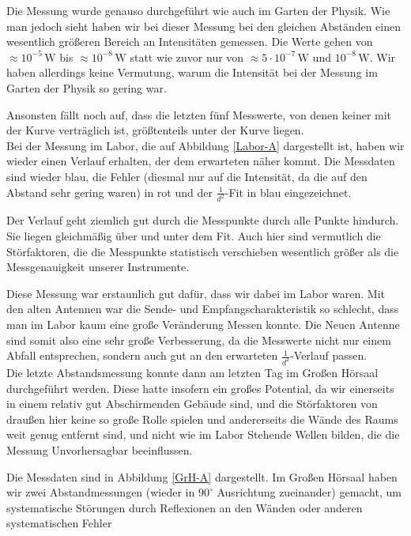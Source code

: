 \documentclass[titlepage,11pt,a4paper,ngerman]{article}
\newcommand{\tx}[1]{\textrm{#1}}
\begin{document}
Die Messung wurde genauso durchgeführt wie auch im Garten der Physik. Wie man jedoch sieht haben wir bei dieser Messung bei den gleichen Abständen einen wesentlich größeren Bereich an Intensitäten gemessen. Die Werte gehen von $ \approx 10^{-5} \, \tx{W} $ bis $ \approx 10^{-8} \, \tx{W} $ statt wie zuvor nur von $ \approx 5 \cdot 10^{-7} \, \tx{W} $ und $ 10^{-8} \, \tx{W} $. Wir haben allerdings keine Vermutung, warum die Intensität bei der Messung im Garten der Physik so gering war.\par
Ansonsten fällt noch auf, dass die letzten fünf Messwerte, von denen keiner mit der Kurve verträglich ist, größtenteils unter der Kurve liegen.\\[10pt]
\noindent
Bei der Messung im Labor, die auf Abbildung \ref{Labor-A} dargestellt ist, haben wir wieder einen Verlauf erhalten, der dem erwarteten näher kommt. Die Messdaten sind wieder blau, die Fehler (diesmal nur auf die Intensität, da die auf den Abstand sehr gering waren) in rot und der $ \frac{1}{d^2} $-Fit in blau eingezeichnet.\par
Der Verlauf geht ziemlich gut durch die Messpunkte durch alle Punkte hindurch. Sie liegen gleichmäßig über und unter dem Fit. Auch hier sind vermutlich die Störfaktoren, die die Messpunkte statistisch verschieben wesentlich größer als die Messgenauigkeit unserer Instrumente.\par
Diese Messung war erstaunlich gut dafür, dass wir dabei im Labor waren. Mit den alten Antennen war die Sende- und Empfangscharakteristik so schlecht, dass man im Labor kaum eine große Veränderung Messen konnte. Die Neuen Antenne sind somit also eine sehr große Verbesserung, da die Messwerte nicht nur einem Abfall entsprechen, sondern auch gut an den erwarteten $ \frac{1}{d^2} $-Verlauf passen.\\[10pt]
\noindent
Die letzte Abstandsmessung konnte dann am letzten Tag im Großen Hörsaal durchgeführt werden. Diese hatte insofern ein großes Potential, da wir einerseits in einem relativ gut Abschirmenden Gebäude sind, und die Störfaktoren von draußen hier keine so große Rolle spielen und andererseits die Wände des Raums weit genug entfernt sind, und nicht wie im Labor Stehende Wellen bilden, die die Messung Unvorhersagbar beeinflussen.\par
Die Messdaten sind in Abbildung \ref{GrH-A} dargestellt. Im Großen Hörsaal haben wir zwei Abstandmessungen (wieder in $ 90^\circ $ Ausrichtung zueinander) gemacht, um systematische Störungen durch Reflexionen an den Wänden oder anderen systematischen Fehler
\end{document}
